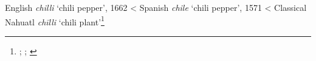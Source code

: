 \begin{etymology}\label{ety:chile}
English \textit{chilli} `chili pepper', 1662
< Spanish \textit{chile} `chili pepper', 1571
< Classical Nahuatl \textit{chīlli} `chili plant'\footnote{\textcite[s.v. chilli]{oed}; \textcite[s.v. chile]{dle}; \textcite[s.v. chilli]{ond}}
\end{etymology}